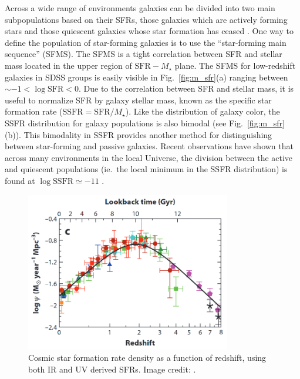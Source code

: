 Across a wide range of environments galaxies
can be divided into two main subpopulations based on their SFRs, those
galaxies which are actively forming stars and those quiescent galaxies
whose star formation has ceased \citep{wetzel2012}.  One way to
define the population of star-forming galaxies is to use the
``star-forming main sequence'' (SFMS).  The SFMS is a tight
correlation between SFR and stellar mass located in the upper region
of $\mathrm{SFR} - M_\star$ plane.  The SFMS for low-redshift galaxies
in SDSS groups is easily visible in Fig.~\ref{fig:m_sfr}(a) ranging
between $\sim -1 < \log \mathrm{SFR} < 0$.  Due to the correlation
between SFR and stellar mass, it is useful to normalize SFR by galaxy
stellar mass, known as the specific star formation rate
($\mathrm{SSFR} = \mathrm{SFR}/M_\star$).  Like the distribution of
galaxy color, the SSFR distribution for galaxy populations is also
bimodal (see Fig.~\ref{fig:m_sfr}(b)).  This bimodality in SSFR
provides another method for distinguishing between star-forming and
passive galaxies.  Recent observations have shown that across
many environments in the local Universe, the division between
the active and quiescent populations (ie.\ the local minimum in the
SSFR distribution) is found at $\log \mathrm{SSFR} \simeq -11$
\citep{wetzel2012}.

\begin{figure}[!ht]
  \centering
  \includegraphics[width=0.8\textwidth]{lilly_madau.png}
  \caption{Cosmic star formation rate density as a function of
    redshift, using both IR and UV derived SFRs.  Image credit:
    \citet{madau2014}.}
  \label{fig:lilly_madau}
\end{figure}

